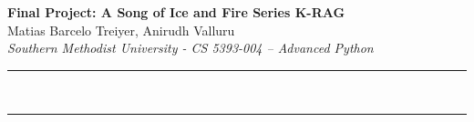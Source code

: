 \documentclass[a4paper,12pt]{article}
\renewenvironment{abstract}
 {\par\noindent\textbf{\abstractname}\ \ignorespaces \\}
 {\par\noindent\medskip}
\begin{document}
\pagestyle{fancy}
\thispagestyle{empty}
\fancyhead[R]{}
\fancyhead[L]{}
\renewcommand*{\thefootnote}{\fnsymbol{footnote}}
\begin{center}
\Large{\textbf{Final Project: A Song of Ice and Fire Series K-RAG}}
\vspace{0.4cm}
\normalsize
\\ Matias Barcelo Treiyer, Anirudh Valluru \\
\vspace{0.1cm}
\textit{Southern Methodist University - CS 5393-004 – Advanced Python}
\medskip
\normalsize
\end{center}
{\color{gray}\hrule}
\vspace{0.4cm}
\begin{abstract}

\end{abstract}
{\color{gray}\hrule}

\newpage
\tableofcontents
\bigskip






\end{document}
